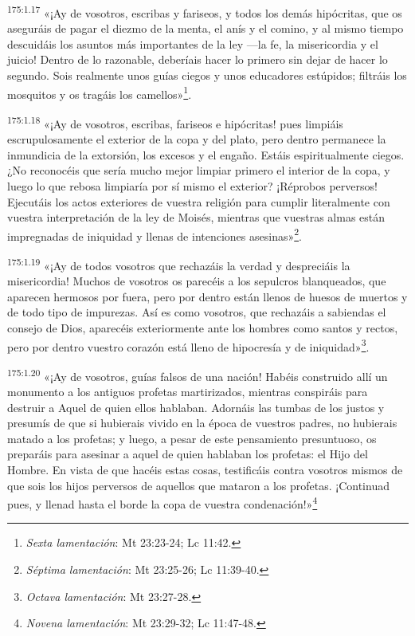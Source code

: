 \par 
\textsuperscript{175:1.17} «¡Ay de vosotros, escribas y fariseos, y todos los demás hipócritas, que os aseguráis de pagar el diezmo de la menta, el anís y el comino, y al mismo tiempo descuidáis los asuntos más importantes de la ley ---la fe, la misericordia y el juicio! Dentro de lo razonable, deberíais hacer lo primero sin dejar de hacer lo segundo. Sois realmente unos guías ciegos y unos educadores estúpidos; filtráis los mosquitos y os tragáis los camellos»\footnote{\textit{Sexta lamentación}: Mt 23:23-24; Lc 11:42.}.

\par 
\textsuperscript{175:1.18} «¡Ay de vosotros, escribas, fariseos e hipócritas! pues limpiáis escrupulosamente el exterior de la copa y del plato, pero dentro permanece la inmundicia de la extorsión, los excesos y el engaño. Estáis espiritualmente ciegos. ¿No reconocéis que sería mucho mejor limpiar primero el interior de la copa, y luego lo que rebosa limpiaría por sí mismo el exterior? ¡Réprobos perversos! Ejecutáis los actos exteriores de vuestra religión para cumplir literalmente con vuestra interpretación de la ley de Moisés, mientras que vuestras almas están impregnadas de iniquidad y llenas de intenciones asesinas»\footnote{\textit{Séptima lamentación}: Mt 23:25-26; Lc 11:39-40.}.

\par 
\textsuperscript{175:1.19} «¡Ay de todos vosotros que rechazáis la verdad y despreciáis la misericordia! Muchos de vosotros os parecéis a los sepulcros blanqueados, que aparecen hermosos por fuera, pero por dentro están llenos de huesos de muertos y de todo tipo de impurezas. Así es como vosotros, que rechazáis a sabiendas el consejo de Dios, aparecéis exteriormente ante los hombres como santos y rectos, pero por dentro vuestro corazón está lleno de hipocresía y de iniquidad»\footnote{\textit{Octava lamentación}: Mt 23:27-28.}.

\par 
\textsuperscript{175:1.20} «¡Ay de vosotros, guías falsos de una nación! Habéis construido allí un monumento a los antiguos profetas martirizados, mientras conspiráis para destruir a Aquel de quien ellos hablaban. Adornáis las tumbas de los justos y presumís de que si hubierais vivido en la época de vuestros padres, no hubierais matado a los profetas; y luego, a pesar de este pensamiento presuntuoso, os preparáis para asesinar a aquel de quien hablaban los profetas: el Hijo del Hombre. En vista de que hacéis estas cosas, testificáis contra vosotros mismos de que sois los hijos perversos de aquellos que mataron a los profetas. ¡Continuad pues, y llenad hasta el borde la copa de vuestra condenación!»\footnote{\textit{Novena lamentación}: Mt 23:29-32; Lc 11:47-48.}

